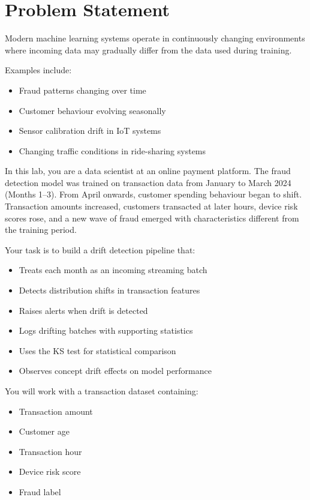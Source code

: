 \documentclass[12pt,a4paper]{article}
\begin{document}

\section*{Problem Statement}

Modern machine learning systems operate in continuously changing environments where incoming data may gradually differ from the data used during training.

Examples include:
\begin{itemize}
\item Fraud patterns changing over time
\item Customer behaviour evolving seasonally
\item Sensor calibration drift in IoT systems
\item Changing traffic conditions in ride-sharing systems
\end{itemize}

In this lab, you are a data scientist at an online payment platform. The fraud detection model was trained on transaction data from January to March 2024 (Months 1--3). From April onwards, customer spending behaviour began to shift. Transaction amounts increased, customers transacted at later hours, device risk scores rose, and a new wave of fraud emerged with characteristics different from the training period.

Your task is to build a drift detection pipeline that:
\begin{itemize}
\item Treats each month as an incoming streaming batch
\item Detects distribution shifts in transaction features
\item Raises alerts when drift is detected
\item Logs drifting batches with supporting statistics
\item Uses the KS test for statistical comparison
\item Observes concept drift effects on model performance
\end{itemize}

You will work with a transaction dataset containing:
\begin{itemize}
\item Transaction amount
\item Customer age
\item Transaction hour
\item Device risk score
\item Fraud label
\end{itemize}
\end{document}
